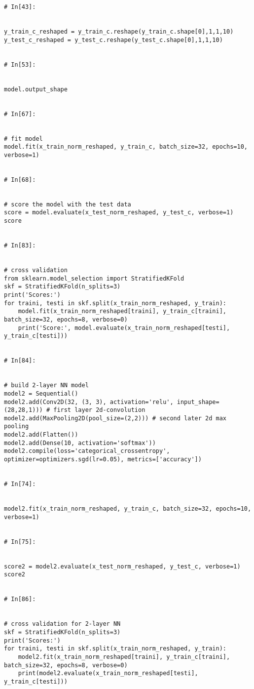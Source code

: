 \documentclass[12pt, a4paper]{article}
\begin{document}
\begin{verbatim}
# In[43]:


y_train_c_reshaped = y_train_c.reshape(y_train_c.shape[0],1,1,10)
y_test_c_reshaped = y_test_c.reshape(y_test_c.shape[0],1,1,10)


# In[53]:


model.output_shape


# In[67]:


# fit model
model.fit(x_train_norm_reshaped, y_train_c, batch_size=32, epochs=10, verbose=1)


# In[68]:


# score the model with the test data
score = model.evaluate(x_test_norm_reshaped, y_test_c, verbose=1)
score


# In[83]:


# cross validation
from sklearn.model_selection import StratifiedKFold
skf = StratifiedKFold(n_splits=3)
print('Scores:')
for traini, testi in skf.split(x_train_norm_reshaped, y_train):
    model.fit(x_train_norm_reshaped[traini], y_train_c[traini], batch_size=32, epochs=8, verbose=0)
    print('Score:', model.evaluate(x_train_norm_reshaped[testi], y_train_c[testi]))


# In[84]:


# build 2-layer NN model
model2 = Sequential()
model2.add(Conv2D(32, (3, 3), activation='relu', input_shape=(28,28,1))) # first layer 2d-convolution
model2.add(MaxPooling2D(pool_size=(2,2))) # second later 2d max pooling
model2.add(Flatten())
model2.add(Dense(10, activation='softmax'))
model2.compile(loss='categorical_crossentropy', optimizer=optimizers.sgd(lr=0.05), metrics=['accuracy'])


# In[74]:


model2.fit(x_train_norm_reshaped, y_train_c, batch_size=32, epochs=10, verbose=1)


# In[75]:


score2 = model2.evaluate(x_test_norm_reshaped, y_test_c, verbose=1)
score2


# In[86]:


# cross validation for 2-layer NN
skf = StratifiedKFold(n_splits=3)
print('Scores:')
for traini, testi in skf.split(x_train_norm_reshaped, y_train):
    model2.fit(x_train_norm_reshaped[traini], y_train_c[traini], batch_size=32, epochs=8, verbose=0)
    print(model2.evaluate(x_train_norm_reshaped[testi], y_train_c[testi]))


\end{verbatim}
\end{document}

